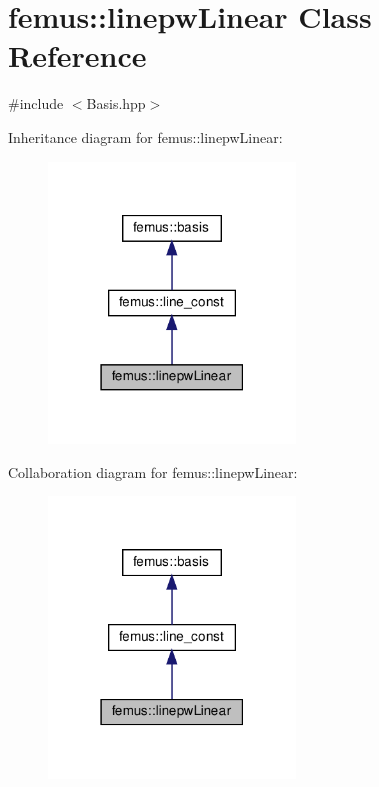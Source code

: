 \hypertarget{classfemus_1_1linepw_linear}{}\section{femus\+:\+:linepw\+Linear Class Reference}
\label{classfemus_1_1linepw_linear}


{\ttfamily \#include $<$Basis.\+hpp$>$}



Inheritance diagram for femus\+:\+:linepw\+Linear\+:
\nopagebreak
\begin{figure}[H]
\begin{center}
\leavevmode
\includegraphics[width=186pt]{classfemus_1_1linepw_linear__inherit__graph}
\end{center}
\end{figure}


Collaboration diagram for femus\+:\+:linepw\+Linear\+:
\nopagebreak
\begin{figure}[H]
\begin{center}
\leavevmode
\includegraphics[width=186pt]{classfemus_1_1linepw_linear__coll__graph}
\end{center}
\end{figure}
